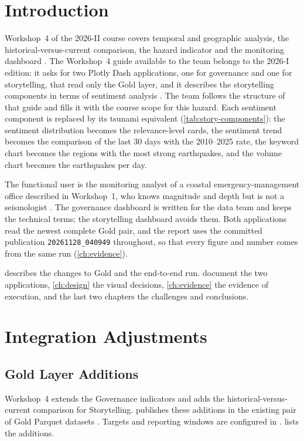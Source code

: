 \documentclass[a4paper,11pt,oneside]{book}
\begin{document}
\chapter{Introduction}
Workshop~4 of the 2026-II course covers temporal and geographic analysis, the historical-versus-current comparison, the hazard indicator and the monitoring dashboard \cite{courseproject,teamassignment}. The Workshop~4 guide available to the team belongs to the 2026-I edition: it asks for two Plotly Dash applications, one for governance and one for storytelling, that read only the Gold layer, and it describes the storytelling components in terms of sentiment analysis \cite{dashboardguide}. The team follows the structure of that guide and fills it with the course scope for this hazard. Each sentiment component is replaced by its tsunami equivalent (\cref{tab:story-components}): the sentiment distribution becomes the relevance-level cards, the sentiment trend becomes the comparison of the last 30 days with the 2010--2025 rate, the keyword chart becomes the regions with the most strong earthquakes, and the volume chart becomes the earthquakes per day.

The functional user is the monitoring analyst of a coastal emergency-management office described in Workshop~1, who knows magnitude and depth but is not a seismologist \cite{workshop1}. The governance dashboard is written for the data team and keeps the technical terms; the storytelling dashboard avoids them. Both applications read the newest complete Gold pair, and the report uses the committed publication \texttt{20261128\_040949} throughout, so that every figure and number comes from the same run (\cref{ch:evidence}).

 describes the changes to Gold and the end-to-end run.  document the two applications, \cref{ch:design} the visual decisions, \cref{ch:evidence} the evidence of execution, and the last two chapters the challenges and conclusions.

\chapter{Integration Adjustments}
\label{ch:integration}
\section{Gold Layer Additions}
Workshop~4 extends the Governance indicators and adds the historical-versus-current comparison for Storytelling.  publishes these additions in the existing pair of Gold Parquet datasets \cite{workshop3}. Targets and reporting windows are configured in .  lists the additions.
\end{document}
